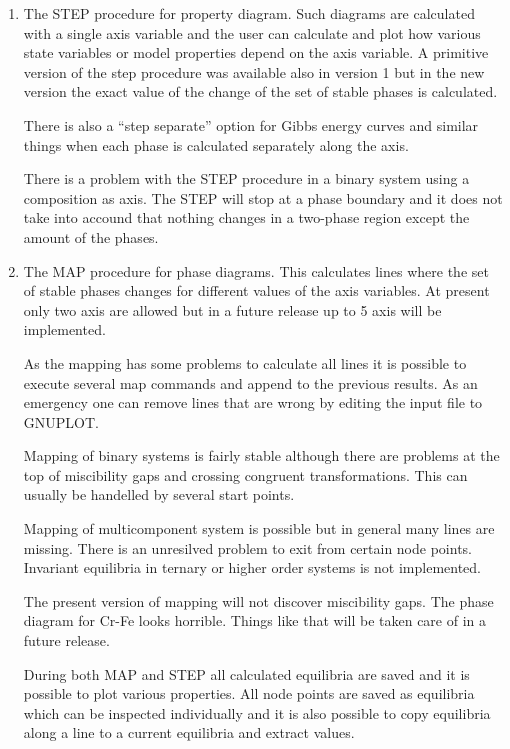 \documentclass[12pt]{article}
\begin{document}
\begin{enumerate}
\item The STEP procedure for property diagram.  Such diagrams are
  calculated with a single axis variable and the user can calculate
  and plot how various state variables or model properties depend on
  the axis variable.  A primitive version of the step procedure was
  available also in version 1 but in the new version the exact value
  of the change of the set of stable phases is calculated.

  There is also a ``step separate'' option for Gibbs energy curves and
  similar things when each phase is calculated separately along the
  axis.

  There is a problem with the STEP procedure in a binary system using
  a composition as axis.  The STEP will stop at a phase boundary and
  it does not take into accound that nothing changes in a two-phase
  region except the amount of the phases.

\item The MAP procedure for phase diagrams.  This calculates lines
  where the set of stable phases changes for different values of the
  axis variables.  At present only two axis are allowed but in a
  future release up to 5 axis will be implemented.

  As the mapping has some problems to calculate all lines it is
  possible to execute several map commands and append to the previous
  results.  As an emergency one can remove lines that are wrong by
  editing the input file to GNUPLOT.

  Mapping of binary systems is fairly stable although there are
  problems at the top of miscibility gaps and crossing congruent
  transformations.  This can usually be handelled by several start
  points.

  Mapping of multicomponent system is possible but in general many
  lines are missing.  There is an unresilved problem to exit from
  certain node points.  Invariant equilibria in ternary or higher
  order systems is not implemented.

  The present version of mapping will not discover miscibility gaps.
  The phase diagram for Cr-Fe looks horrible.  Things like that will
  be taken care of in a future release.

  During both MAP and STEP all calculated equilibria are saved and it
  is possible to plot various properties.  All node points are saved
  as equilibria which can be inspected individually and it is also
  possible to copy equilibria along a line to a current equilibria and
  extract values.


\end{enumerate}
\end{document}
